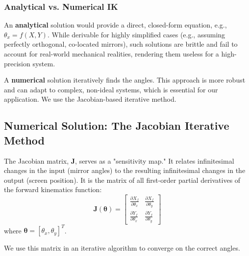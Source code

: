 \documentclass[12pt]{article}
\begin{document}
\subsubsection{Analytical vs. Numerical IK}
An \textbf{analytical} solution would provide a direct, closed-form equation, e.g., \(\theta_x = f(X,Y)\). While derivable for highly simplified cases (e.g., assuming perfectly orthogonal, co-located mirrors), such solutions are brittle and fail to account for real-world mechanical realities, rendering them useless for a high-precision system.

A \textbf{numerical} solution iteratively finds the angles. This approach is more robust and can adapt to complex, non-ideal systems, which is essential for our application. We use the Jacobian-based iterative method.

\subsection{Numerical Solution: The Jacobian Iterative Method}

The Jacobian matrix, \(\mathbf{J}\), serves as a "sensitivity map." It relates infinitesimal changes in the input (mirror angles) to the resulting infinitesimal changes in the output (screen position). It is the matrix of all first-order partial derivatives of the forward kinematics function:
\begin{equation}
    \mathbf{J}(\boldsymbol{\theta}) = \begin{bmatrix} \frac{\partial X_f}{\partial \theta_x} & \frac{\partial X_f}{\partial \theta_y} \\ \frac{\partial Y_f}{\partial \theta_x} & \frac{\partial Y_f}{\partial \theta_y} \end{bmatrix}
\end{equation}
where \(\boldsymbol{\theta} = [\theta_x, \theta_y]^T\).

We use this matrix in an iterative algorithm to converge on the correct angles.
\end{document}

